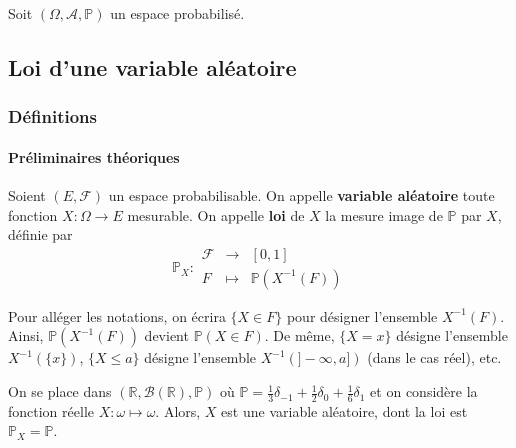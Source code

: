 




  Soit $(\Omega, \mathcal{A}, \mathbb{P})$ un espace probabilisé.

  \subsection{Loi d'une variable aléatoire}

  \subsubsection{Définitions}

  \paragraph{Préliminaires théoriques}


  \begin{definition}
    Soient $(E, \mathcal{F})$ un espace probabilisable. On appelle \textbf{variable aléatoire} toute fonction $X : \Omega \rightarrow E$ mesurable. On appelle \textbf{loi} de $X$ la mesure image de $\mathbb{P}$ par $X$, définie par
    \[
      \mathbb{P}_X :
      \begin{array}{ccc}
        \mathcal{F} &\rightarrow& [0,1] \\
        F &\mapsto& \mathbb{P}(X^{-1}(F))
      \end{array}
    \]
  \end{definition}

  \begin{notation}
    Pour alléger les notations, on écrira $\{ X \in F \}$ pour désigner l'ensemble $X^{-1}(F)$. Ainsi, $\mathbb{P}(X^{-1}(F))$ devient $\mathbb{P}(X \in F)$. De même, $\{ X = x \}$ désigne l'ensemble $X^{-1}(\{x\})$, $\{ X \leq a \}$ désigne l'ensemble $X^{-1}(]-\infty, a])$ (dans le cas réel), etc.
  \end{notation}


  \begin{example}
    On se place dans $(\mathbb{R}, \mathcal{B}(\mathbb{R}), \mathbb{P})$ où $\mathbb{P} = \frac{1}{3} \delta_{-1} + \frac{1}{2} \delta_{0} + \frac{1}{6} \delta_{1}$ et on considère la fonction réelle $X : \omega \mapsto \omega$. Alors, $X$ est une variable aléatoire, dont la loi est $\mathbb{P}_X = \mathbb{P}$.
  \end{example}

